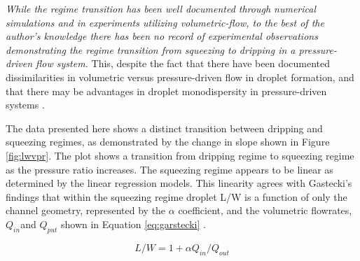 \emph{While the regime transition has been well documented through numerical simulations and in experiments utilizing volumetric-flow, to the best of the author's knowledge there has been no record of experimental observations demonstrating the regime transition from squeezing to dripping in a pressure-driven flow system.} This, despite the fact that there have been documented dissimilarities in volumetric versus pressure-driven flow in droplet formation\cite{Ward2005}, and that there may be advantages in droplet monodispersity in pressure-driven systems \cite{Christopher2008,Li2014a}.

The data presented here shows a distinct transition between dripping and squeezing regimes, as demonstrated by the change in slope shown in Figure \vref{fig:lwvpr}. The plot shows a transition from dripping regime to squeezing regime as the pressure ratio increases. The squeezing regime appears to be linear as determined by the linear regression models. This linearity agrees with Gastecki's findings that within the squeezing regime droplet L/W is a function of only the channel geometry, represented by the $\alpha$ coefficient, and the  volumetric flowrates, $Q_{in} $and $ Q_{put}$ shown in Equation \vref{eq:garstecki} \cite{Garstecki2006}.

\begin{equation}
L/W = 1 + \alpha Q_{in} / Q_{out}
\label{eq:garstecki}
\end{equation}

